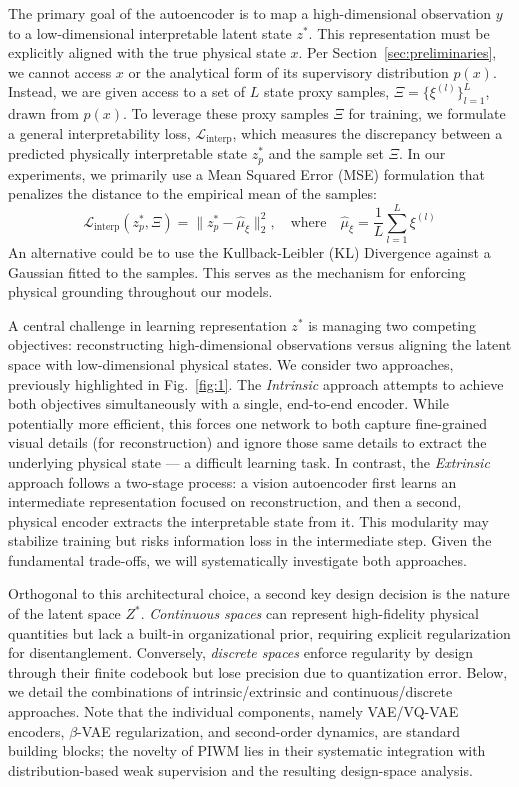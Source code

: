 \documentclass[nonacm,sigconf]{acmart}
\begin{document}
The primary goal of the autoencoder is to map a high-dimensional observation \(y\) to a low-dimensional interpretable latent state \(z^*\). This representation must be explicitly aligned with the true physical state \(x\). Per Section~\ref{sec:preliminaries}, we cannot access \(x\) or the analytical form of its supervisory distribution \(p(x)\). Instead, we are given access to a set of \(L\) state proxy samples, \(\Xi = \{\xi^{(l)}\}_{l=1}^L\), drawn from \(p(x)\). To leverage these proxy samples \(\Xi\) for training, we formulate a general {interpretability loss}, \(\mathcal{L}_{\text{interp}}\), which measures the discrepancy between a predicted physically interpretable state \(z_p^*\) and the sample set \(\Xi\). In our experiments, we primarily use a Mean Squared Error (MSE) formulation that penalizes the distance to the empirical mean of the samples:
\begin{equation}
\mathcal{L}_{\text{interp}}(z_p^*, \Xi) = \| z_p^* - \hat{\mu}_{\xi} \|_2^2, \quad \text{where} \quad \hat{\mu}_{\xi} = \frac{1}{L}\sum_{l=1}^L \xi^{(l)}
\label{eq:interp_loss}
\end{equation}
An alternative could be to use the Kullback-Leibler (KL) Divergence against a Gaussian fitted to the samples. This serves as the mechanism for enforcing physical grounding throughout our models.


A central challenge in learning representation \(z^*\) is managing two competing objectives: reconstructing high-dimensional observations versus aligning the latent space with low-dimensional physical states. We consider two approaches, previously highlighted in Fig.~\ref{fig:1}. The \emph{Intrinsic} approach attempts to achieve both objectives simultaneously with a single, end-to-end encoder. While potentially more efficient, this forces one network to both capture fine-grained visual details (for reconstruction) and ignore those same details to extract the underlying physical state --- a difficult learning task. In contrast, the \emph{Extrinsic} approach follows a two-stage process: a vision autoencoder first learns an intermediate representation focused on reconstruction, and then a second, physical encoder extracts the interpretable state from it. This modularity may stabilize training but risks information loss in the intermediate step. Given the fundamental trade-offs, we will systematically investigate both approaches.

Orthogonal to this architectural choice, a second key design decision is the nature of the latent space \(Z^*\). \emph{Continuous spaces} can represent high-fidelity physical quantities but lack a built-in organizational prior, requiring explicit regularization for disentanglement. Conversely, \emph{discrete spaces} enforce regularity by design through their finite codebook but lose precision due to quantization error.
Below, we detail the combinations of intrinsic/extrinsic and continuous/discrete approaches. Note that the individual components, namely VAE/VQ-VAE encoders, $\beta$-VAE regularization, and second-order dynamics, are standard building blocks; the novelty of PIWM lies in their systematic integration with distribution-based weak supervision and the resulting design-space analysis.
\end{document}
